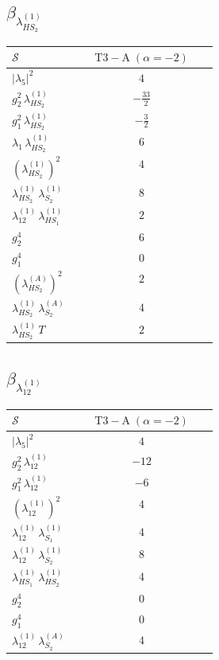 \documentclass[9pt]{article}
\begin{document}
\subsection*{$ \beta_{\lambda_{HS_2}^{(1)}} $}
\begin{longtable}{@{}p{0.31\linewidth}c@{}}
\toprule
$\mathcal{S}$ & $ \mathrm{T3-A}\;(\alpha=-2) $ \\
\midrule
$ |\lambda_5|^2 $ & $ 4 $ \\
$ g_2^2\,\lambda_{HS_2}^{(1)} $ & $ - \frac{33}{2} $ \\
$ g_1^2\,\lambda_{HS_2}^{(1)} $ & $ - \frac{3}{2} $ \\
$ \lambda_1\,\lambda_{HS_2}^{(1)} $ & $ 6 $ \\
$ \left(\lambda_{HS_2}^{(1)}\right)^2 $ & $ 4 $ \\
$ \lambda_{HS_2}^{(1)}\,\lambda_{S_2}^{(1)} $ & $ 8 $ \\
$ \lambda_{12}^{(1)}\,\lambda_{HS_1}^{(1)} $ & $ 2 $ \\
$ g_2^4 $ & $ 6 $ \\
$ g_1^4 $ & $ 0 $ \\
$ \left(\lambda_{HS_2}^{(A)}\right)^2 $ & $ 2 $ \\
$ \lambda_{HS_2}^{(1)}\,\lambda_{S_2}^{(A)} $ & $ 4 $ \\
$ \lambda_{HS_2}^{(1)}\,T $ & $ 2 $ \\
\bottomrule
\end{longtable}
\subsection*{$ \beta_{\lambda_{12}^{(1)}} $}
\begin{longtable}{@{}p{0.31\linewidth}c@{}}
\toprule
$\mathcal{S}$ & $ \mathrm{T3-A}\;(\alpha=-2) $ \\
\midrule
$ |\lambda_5|^2 $ & $ 4 $ \\
$ g_2^2\,\lambda_{12}^{(1)} $ & $ -12 $ \\
$ g_1^2\,\lambda_{12}^{(1)} $ & $ -6 $ \\
$ \left(\lambda_{12}^{(1)}\right)^2 $ & $ 4 $ \\
$ \lambda_{12}^{(1)}\,\lambda_{S_1}^{(1)} $ & $ 4 $ \\
$ \lambda_{12}^{(1)}\,\lambda_{S_2}^{(1)} $ & $ 8 $ \\
$ \lambda_{HS_1}^{(1)}\,\lambda_{HS_2}^{(1)} $ & $ 4 $ \\
$ g_2^4 $ & $ 0 $ \\
$ g_1^4 $ & $ 0 $ \\
$ \lambda_{12}^{(1)}\,\lambda_{S_2}^{(A)} $ & $ 4 $ \\
\bottomrule
\end{longtable}
\end{document}
